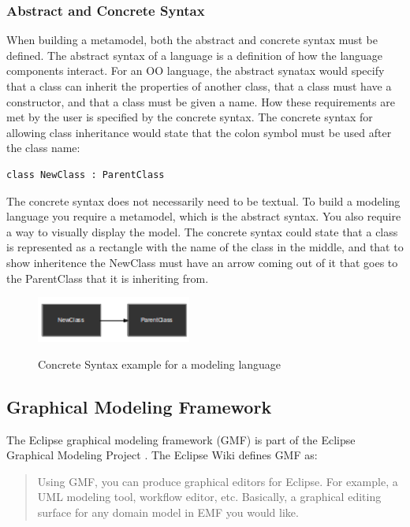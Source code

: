 \subsubsection{Abstract and Concrete Syntax}

When building a metamodel, both the abstract and concrete syntax must be defined. The abstract syntax of a language is a definition of how the language components interact. For an OO language, the abstract synatax would specify that a class can inherit the properties of another class, that a class must have a constructor, and that a class must be given a name. How these requirements are met by the user is specified by the concrete syntax. The concrete syntax for allowing class inheritance would state that the colon symbol must be used after the class name:

\begin{lstlisting}
class NewClass : ParentClass
\end{lstlisting}

The concrete syntax does not necessarily need to be textual. To build a modeling language you require a metamodel, which is the abstract syntax. You also require a way to visually display the model. The concrete syntax could state that a class is represented as a rectangle with the name of the class in the middle, and that to show inheritence the NewClass must have an arrow coming out of it that goes to the ParentClass that it is inheriting from.

\begin{figure}[h]
\begin{center}
	\includegraphics[width=2in]{figures/concrete_syntax.png}
	\label{concreteSyntaxFigure}
	\caption{Concrete Syntax example for a modeling language}
\end{center}
\end{figure}

\subsection{Graphical Modeling Framework}

The Eclipse graphical modeling framework (GMF) is part of the Eclipse Graphical Modeling Project \citep{gmpSite}. The Eclipse Wiki \cite{gmpFAQ} defines GMF as:

\begin{quote} Using GMF, you can produce graphical editors for Eclipse. For example, a UML modeling tool, workflow editor, etc. Basically, a graphical editing surface for any domain model in EMF you would like. \end{quote}




